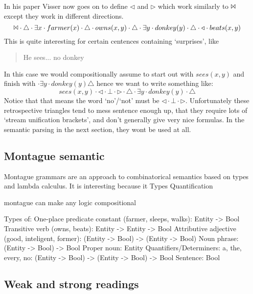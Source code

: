 \documentclass[12pt]{article}
\begin{document}
In his paper Visser now goes on to define $\triangleleft$ and $\triangleright$ which work similarly to $\Bowtie$ except they work in different directions. 
%
\begin{equation}
\Bowtie \cdot \triangle \cdot \exists x \cdot farmer(x) \cdot \triangle \cdot owns(x,y) \cdot \triangle \cdot \exists y \cdot donkey(y) \cdot \triangle \cdot \triangleleft \cdot beats(x,y)
\end{equation}
%
This is quite interesting for certain centences containing `surprises', like
%
\begin{quotation}
He sees... no donkey
\end{quotation}
%
In this case we would compositionally assume to start out with
$sees(x,y)$ and finish with $\cdot \exists y \cdot donkey(y)\triangle$ hence we want to write something like:
%
\begin{equation}
sees(x,y) \cdot \triangleleft \cdot \bot \cdot \triangleright \cdot \triangle \cdot \exists y \cdot donkey(y) \cdot \triangle
\end{equation}
%
Notice that that means the word `no'/`not' must be $\triangleleft\cdot\bot\cdot\triangleright$. Unfortunately these retrospective triangles tend to mess sentence enough up, that they require lots of `stream unification brackets', and don't generally give very nice formulas. In the semantic parsing in the next section, they wont be used at all.

\subsection{Montague semantic}
Montague grammars are an approach to combinatorical semantics based on types and lambda calculus. It is interesting because it 
Types
Quantification

montague can make any logic compositional

Types of:
  One-place predicate constant (farmer, sleeps, walks): Entity -> Bool
  Transitive verb (owns, beats): Entity -> Entity -> Bool
  Attributive adjective (good, inteligent, former): (Entity -> Bool) -> (Entity -> Bool)
  Noun phrase: (Entity -> Bool) -> Bool
  Proper noun: Entity
  Quantifiers/Determiners: a, the, every, no: (Entity -> Bool) -> (Entity -> Bool) -> Bool
  Sentence: Bool

\subsection{Weak and strong readings}
\end{document}
